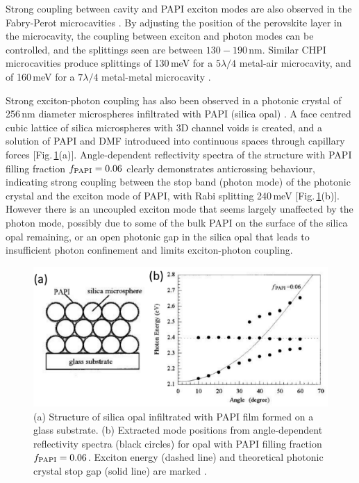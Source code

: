 Strong coupling between cavity and PAPI exciton modes are also observed in the Fabry-Perot microcavities \cite{Brehier2006, Lanty2008}. By adjusting the position of the perovskite layer in the microcavity, the coupling between exciton and photon modes can be controlled, and the splittings seen are between $130-190$\,nm. Similar CHPI microcavities produce splittings of 130\,meV for a $5\lambda/4$ metal-air microcavity, and of 160\,meV for a $7\lambda/4$ metal-metal microcavity \cite{Pradeesh2009b}.

Strong exciton-photon coupling has also been observed in a photonic crystal of 256\,nm diameter microspheres infiltrated with PAPI (silica opal) \cite{Sumioka2001}. A face centred cubic lattice of silica microspheres with 3D channel voids is created, and a solution of PAPI and DMF introduced into continuous spaces through capillary forces [Fig.\,\ref{2Fig21}(a)]. Angle-dependent reflectivity spectra of the structure with PAPI filling fraction $f_{\textnormal{PAPI}}=0.06$ clearly demonstrates anticrossing behaviour, indicating strong coupling between the stop band (photon mode) of the photonic crystal and the exciton mode of PAPI, with Rabi splitting 240\,meV [Fig.\,\ref{2Fig21}(b)]. However there is an uncoupled exciton mode that seems largely unaffected by the photon mode, possibly due to some of the bulk PAPI on the surface of the silica opal remaining, or an open photonic gap in the silica opal that leads to insufficient photon confinement and limits exciton-photon coupling. 
\begin{figure}[h!]
\centering
\includegraphics[width=\textwidth]{Fig21}
\caption{(a) Structure of silica opal infiltrated with PAPI film formed on a glass substrate. (b) Extracted mode positions from angle-dependent reflectivity spectra (black circles) for opal with PAPI filling fraction $f_{\textnormal{PAPI}}=0.06$. Exciton energy (dashed line) and theoretical photonic crystal stop gap (solid line) are marked \cite{Sumioka2001}.}
\label{2Fig21}
\end{figure}

